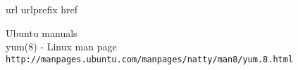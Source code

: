 \begin{thebibliography}{10}
\expandafter\ifx\csname url\endcsname\relax
  \def\url#1{\texttt{#1}}\fi
\expandafter\ifx\csname urlprefix\endcsname\relax\def\urlprefix{URL }\fi
\expandafter\ifx\csname href\endcsname\relax
  \def\href#1#2{#2} \def\path#1{#1}\fi

Ubuntu manuals\\
yum(8) - Linux man page\\
\url{http://manpages.ubuntu.com/manpages/natty/man8/yum.8.html}


\end{thebibliography}

